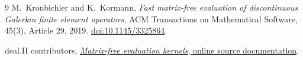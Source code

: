 \documentclass[11pt]{article}
\begin{document}
\begin{thebibliography}{9}
 M.~Kronbichler and K.~Kormann,
 \emph{Fast matrix-free evaluation of discontinuous Galerkin finite element
 operators}, ACM Transactions on Mathematical Software, 45(3), Article 29, 2019.
 \href{https://doi.org/10.1145/3325864}{doi:10.1145/3325864}.

 deal.II contributors,
 \href{https://dealii.org/developer/doxygen/deal.II/evaluation__kernels_8h_source.html}
 {\emph{Matrix-free evaluation kernels}, online source documentation}.
\end{thebibliography}
\end{document}
